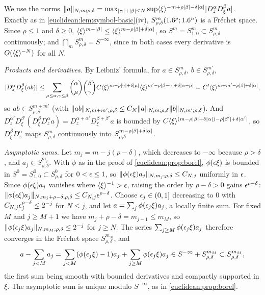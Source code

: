 We use the norms
$\lVert a\rVert_{N,m;\rho,\delta}=\max_{\lvert \alpha\rvert+\lvert \beta\rvert\le N}\sup\langle \xi\rangle^{-m+\rho\lvert \beta\rvert-\delta\lvert \alpha\rvert}
\lvert D^\alpha_zD^\beta_\xi a\rvert$. Exactly as in \cref{euclidean:lem:symbol-basic}(iv),
$S^m_{\rho,\delta}(1.6^p;1.6^n)$ is a Fr\'echet space. Since $\rho\le1$ and $\delta\ge0$,
$\langle \xi\rangle^{m-\lvert \beta\rvert}\le\langle \xi\rangle^{m-\rho\lvert \beta\rvert+\delta\lvert \alpha\rvert}$, so
$S^m=S^m_{1,0}\subset S^m_{\rho,\delta}$ continuously; and
$\bigcap_mS^m_{\rho,\delta}=S^{-\infty}$, since in both cases every derivative is
$O(\langle \xi\rangle^{-N})$ for all $N$.

\emph{Products and derivatives.} By Leibniz' formula, for $a\in S^m_{\rho,\delta}$,
$b\in S^{m'}_{\rho,\delta}$,
\begin{equation*}
  \lvert D^\alpha_zD^\beta_\xi(ab)\rvert\le\sum_{\mu\le\alpha,\gamma\le\beta}\binom\alpha\mu\binom\beta\gamma
  C\langle \xi\rangle^{m-\rho\lvert \gamma\rvert+\delta\lvert \mu\rvert}\langle \xi\rangle^{m'-\rho\lvert \beta-\gamma\rvert+\delta\lvert \alpha-\mu\rvert}
  =C'\langle \xi\rangle^{m+m'-\rho\lvert \beta\rvert+\delta\lvert \alpha\rvert},
\end{equation*}
so $ab\in S^{m+m'}_{\rho,\delta}$ (with
$\lVert ab\rVert_{N,m+m';\rho,\delta}\le C_N\lVert a\rVert_{N,m;\rho,\delta}\lVert b\rVert_{N,m';\rho,\delta}$). And
$D^{\alpha'}_zD^{\beta'}_\xi(D^\beta_\xi D^\alpha_za)=D^{\alpha+\alpha'}_zD^{\beta+\beta'}_\xi a$ is
bounded by
$C\langle \xi\rangle^{(m-\rho\lvert \beta\rvert+\delta\lvert \alpha\rvert)-\rho\lvert \beta'\rvert+\delta\lvert \alpha'\rvert}$, so
$D^\beta_\xi D^\alpha_z$ maps $S^m_{\rho,\delta}$ continuously into
$S^{m-\rho\lvert \beta\rvert+\delta\lvert \alpha\rvert}_{\rho,\delta}$.

\emph{Asymptotic sums.} Let $m_j=m-j(\rho-\delta)$, which decreases to $-\infty$ because
$\rho>\delta$, and $a_j\in S^{m_j}_{\rho,\delta}$. With $\phi$ as in the proof of
\cref{euclidean:prop:borel}, $\phi(\epsilon\xi)$ is bounded in $S^0=S^0_{1,0}\subset
S^0_{\rho,\delta}$ for $0<\epsilon\le1$, so
$\lVert \phi(\epsilon\xi)a_j\rVert_{N,m_j;\rho,\delta}\le C_{N,j}$ uniformly in $\epsilon$. Since
$\phi(\epsilon\xi)a_j$ vanishes where $\langle \xi\rangle^{-1}>\epsilon$, raising the order by $\rho-\delta>0$
gains $\epsilon^{\rho-\delta}$:
$\lVert \phi(\epsilon\xi)a_j\rVert_{N,m_j+\rho-\delta;\rho,\delta}\le C_{N,j}\epsilon^{\rho-\delta}$.
Choose $\epsilon_j\in(0,1]$ decreasing to $0$ with $C_{N,j}\epsilon_j^{\rho-\delta}\le2^{-j}$ for
$N\le j$, and let $a=\sum_j\phi(\epsilon_j\xi)a_j$, a locally finite sum. For fixed $M$ and
$j\ge M+1$ we have $m_j+\rho-\delta=m_{j-1}\le m_M$, so
$\lVert \phi(\epsilon_j\xi)a_j\rVert_{N,m_M;\rho,\delta}\le2^{-j}$ for $j\ge N$. The series
$\sum_{j\ge M}\phi(\epsilon_j\xi)a_j$ therefore converges in the Fr\'echet space
$S^{m_M}_{\rho,\delta}$, and
\begin{equation*}
  a-\sum_{j<M}a_j=\sum_{j<M}(\phi(\epsilon_j\xi)-1)a_j+\sum_{j\ge M}\phi(\epsilon_j\xi)a_j
  \in S^{-\infty}+S^{m_M}_{\rho,\delta}\subset S^{m_M}_{\rho,\delta},
\end{equation*}
the first sum being smooth with bounded derivatives and compactly supported in $\xi$. The
asymptotic sum is unique modulo $S^{-\infty}$, as in \cref{euclidean:prop:borel}.

